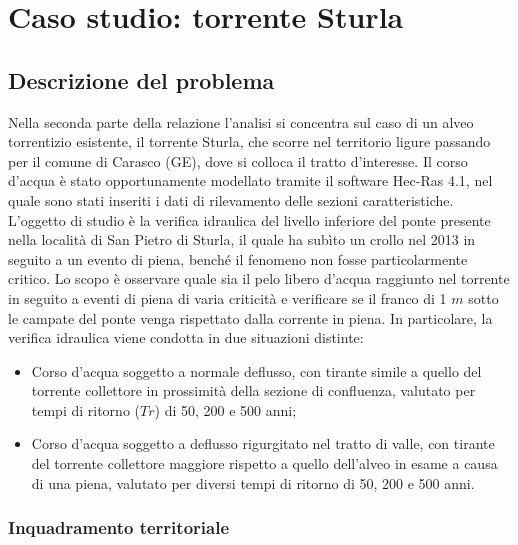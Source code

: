 \documentclass[12pt]{article} %
\begin{document}
\newpage

\section{Caso studio: torrente Sturla}
\subsection{Descrizione del problema}
\noindent Nella seconda parte della relazione l’analisi si concentra sul caso di un alveo torrentizio esistente, il torrente Sturla, che scorre nel territorio ligure passando per il comune di Carasco (GE), dove si colloca il tratto d’interesse. Il corso d’acqua è stato opportunamente modellato tramite il software Hec-Ras 4.1, nel quale sono stati inseriti i dati di rilevamento delle sezioni caratteristiche.
L’oggetto di studio è la verifica idraulica del livello inferiore del ponte presente nella località di San Pietro di Sturla, il quale ha subìto un crollo nel 2013 in seguito a un evento di piena, benché il fenomeno non fosse particolarmente critico. Lo scopo è osservare quale sia il pelo libero d’acqua raggiunto nel torrente in seguito a eventi di piena di varia criticità e verificare se il franco di 1 $m$ sotto le campate del ponte venga rispettato dalla corrente in piena.
In particolare, la verifica idraulica viene condotta in due situazioni distinte:

\begin{itemize}
    \item Corso d'acqua soggetto a normale deflusso, con tirante simile a quello del torrente collettore in prossimità della sezione di confluenza, valutato per tempi di ritorno ($Tr$) di 50, 200 e 500 anni;
    \item Corso d'acqua soggetto a deflusso rigurgitato nel tratto di valle, con tirante del torrente collettore maggiore rispetto a quello dell'alveo in esame a causa di una piena, valutato per diversi tempi di ritorno di 50, 200 e 500 anni.
\end{itemize}

\subsubsection{Inquadramento territoriale}
\end{document}
